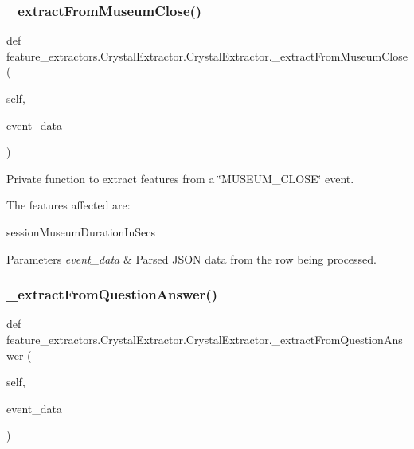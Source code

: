 \subsubsection{\texorpdfstring{\_extractFromMuseumClose()}{\_extractFromMuseumClose()}}
{\footnotesize\ttfamily def feature\+\_\+extractors.\+Crystal\+Extractor.\+Crystal\+Extractor.\+\_\+extract\+From\+Museum\+Close (\begin{DoxyParamCaption}\item[{}]{self,  }\item[{}]{event\+\_\+data }\end{DoxyParamCaption})\hspace{0.3cm}{\ttfamily [private]}}



Private function to extract features from a \char`\"{}\+M\+U\+S\+E\+U\+M\+\_\+\+C\+L\+O\+S\+E\char`\"{} event. 

The features affected are\+:
\begin{DoxyItemize}
\item session\+Museum\+Duration\+In\+Secs
\end{DoxyItemize}


\begin{DoxyParams}{Parameters}
{\em event\+\_\+data} & Parsed J\+S\+ON data from the row being processed. \\
\hline
\end{DoxyParams}
\mbox{\label{classfeature__extractors_1_1_crystal_extractor_1_1_crystal_extractor_aad9c54b2a84c7179f7263b1eb586830e}} 
\subsubsection{\texorpdfstring{\_extractFromQuestionAnswer()}{\_extractFromQuestionAnswer()}}
{\footnotesize\ttfamily def feature\+\_\+extractors.\+Crystal\+Extractor.\+Crystal\+Extractor.\+\_\+extract\+From\+Question\+Answer (\begin{DoxyParamCaption}\item[{}]{self,  }\item[{}]{event\+\_\+data }\end{DoxyParamCaption})\hspace{0.3cm}{\ttfamily [private]}}



